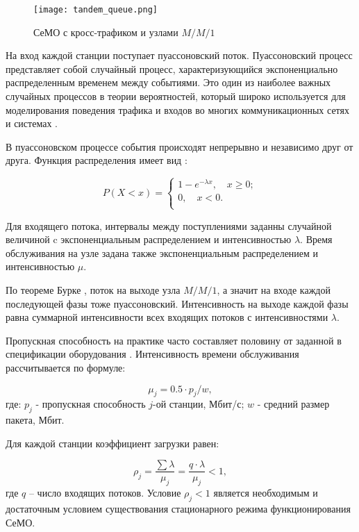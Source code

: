 \begin{figure}[h!]
  \centering
   \texttt{[image: tandem\_queue.png]}
\caption{СеМО с кросс-трафиком и узлами $M/M/1$}
\label{fig:tandem_queue}
\end{figure}

На вход каждой станции поступает пуассоновский поток. Пуассоновский процесс представляет собой случайный процесс, характеризующийся  экспоненциально распределенным временем между событиями. Это один из наиболее важных случайных процессов в теории вероятностей, который широко используется для моделирования поведения трафика и входов во многих коммуникационных сетях и системах \cite{Kalor2018, Gao2016, Malandra2018, Seliem2019}. 

В пуассоновском процессе события происходят непрерывно и независимо друг от друга. Функция распределения имеет вид  \cite{VishnevskyBook, Kleinrock1975}:

\begin{displaymath}
P(X<x) = 
  \begin{cases}
    1 - e^{- \lambda x}, \quad x \geqslant 0; \\
    0, \quad x < 0.\\
  \end{cases}
\end{displaymath}

Для входящего потока, интервалы между поступлениями заданны случайной величиной c экспоненциальным распределением и интенсивностью $\lambda$. Время обслуживания на узле задана также экспоненциальным распределением и интенсивностью $\mu$. 


По теореме Бурке \cite{Burke1956}, поток на выходе узла $M/M/1$, а значит на входе каждой последующей фазы тоже пуассоновский. Интенсивность на выходе каждой фазы равна суммарной интенсивности всех входящих потоков с интенсивностями $\lambda$.

Пропускная способность на практике часто составляет половину от заданной в спецификации оборудования \cite{Proletarsky, Vladimirov2019}. Интенсивность времени обслуживания рассчитывается по формуле: 

\begin{displaymath}
    \mu_j = 0.5 \cdot p_j / w,
\end{displaymath}
где: $p_j$ - пропускная способность $j$-ой станции, Мбит/с; $w$ - средний размер пакета, Мбит.

Для каждой станции коэффициент загрузки равен:


\begin{displaymath}
\rho_j= \frac{\sum{\lambda}}{\mu_j} = \frac{q \cdot \lambda}{\mu_j} <1,
\end{displaymath}
где $q$ -- число входящих потоков. Условие $\rho_j<1$ является необходимым и достаточным условием существования стационарного режима функционирования СеМО.

